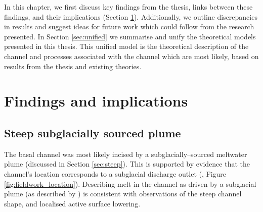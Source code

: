 







In this chapter, we first  discuss key findings from the thesis, links between these findings, and their implications (Section \ref{sec:findings}). Additionally, we outline discrepancies in results and suggest ideas for future work which could follow from the research presented.
In Section \ref{sec:unified}  we summarise and unify the theoretical models presented in this thesis. This unified model is the theoretical description of the channel and processes associated with the channel which are most likely, based on results from the thesis and existing theories.


\section{Findings and implications} \label{sec:findings}


\subsection{Steep subglacially sourced plume}

The basal channel was most likely incised by a subglacially--sourced meltwater plume (discussed in Section \ref{sec:steep}). This is supported by evidence that the channel's location corresponds to a  subglacial discharge outlet (\cite{alley2016impacts,le2009subglacial}, Figure \ref{fig:fieldwork_location}).
Describing melt in the channel as driven by a subglacial plume (as described by \cite{jenkins1991one}) is consistent with observations of the steep channel shape, and localised active surface lowering.

